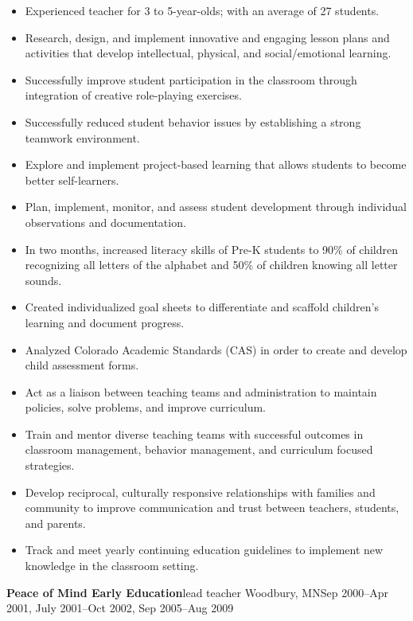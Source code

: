 \documentclass[letterpaper,10pt]{article}
\begin{document}
\begin{itemize}
    \item Experienced teacher for 3 to 5-year-olds; with an average of 27 students.
    \item Research, design, and implement innovative and engaging lesson plans and activities that develop intellectual, physical, and social/emotional learning.
    \item Successfully improve student participation in the classroom through integration of creative role-playing exercises.
    \item Successfully reduced student behavior issues by establishing a strong teamwork environment.
    \item Explore and implement project-based learning that allows students to become better self-learners.
    \item Plan, implement, monitor, and assess student development through individual observations and documentation.
    \item In two months, increased literacy skills of Pre-K students to 90\% of children recognizing
    all letters of the alphabet and 50\% of children knowing all letter sounds.
    \item Created individualized goal sheets to differentiate and scaffold children's learning and document progress.
    \item Analyzed Colorado Academic Standards (CAS) in order to create and develop child assessment forms.
    \item Act as a liaison between teaching teams and administration to maintain policies, solve problems, and improve curriculum.
    \item Train and mentor diverse teaching teams with successful outcomes in classroom management, behavior management, and curriculum focused strategies.
    \item Develop reciprocal, culturally responsive relationships with families and community to improve communication
    and trust between teachers, students, and parents.
    \item Track and meet yearly continuing education guidelines to implement new knowledge in the classroom setting.
\end{itemize}

\vspace{1pc}
\textbf{Peace of Mind Early Education}\hfill lead teacher
\smallbreak Woodbury, MN\hfill Sep 2000--Apr 2001, July 2001--Oct 2002, Sep 2005--Aug 2009
\end{document}
